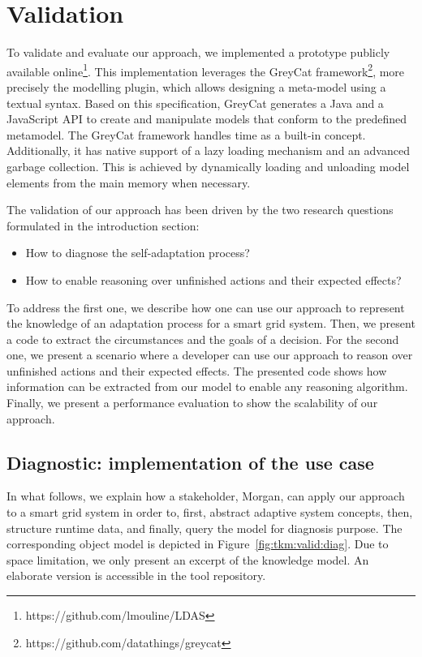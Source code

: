 \section{Validation}
\label{sec:tkm:validation}

To validate and evaluate our approach, we implemented a prototype publicly available online\footnote{https://github.com/lmouline/LDAS}.
This implementation leverages the GreyCat framework\footnote{https://github.com/datathings/greycat}, more precisely the modelling plugin, which allows designing a meta-model using a textual syntax.
Based on this specification, GreyCat generates a Java and a JavaScript API to create and manipulate models that conform to the predefined metamodel.
The GreyCat framework handles time as a built-in concept.
Additionally, it has native support of a lazy loading mechanism and an advanced garbage collection.
This is achieved by dynamically loading and unloading model elements from the main memory when necessary.

The validation of our approach has been driven by the two research questions formulated in the introduction section:
\begin{itemize}
    \item How to diagnose the self-adaptation process?
    \item How to enable reasoning over unfinished actions and their expected effects?
\end{itemize}

To address the first one, we describe how one can use our approach to represent the knowledge of an adaptation process for a smart grid system.
Then, we present a code to extract the circumstances and the goals of a decision.
For the second one, we present a scenario where a developer can use our approach to reason over unfinished actions and their expected effects.
The presented code shows how information can be extracted from our model to enable any reasoning algorithm.
Finally, we present a performance evaluation to show the scalability of our approach.

\subsection{Diagnostic: implementation of the use case}
In what follows, we explain how a stakeholder, Morgan, can apply our approach to a smart grid system in order to, first, abstract adaptive system concepts, then, structure runtime data, and finally, query the model for diagnosis purpose.
The corresponding object model is depicted in Figure~\ref{fig:tkm:valid:diag}.
Due to space limitation, we only present an excerpt of the knowledge model.
An elaborate version is accessible in the tool repository.

